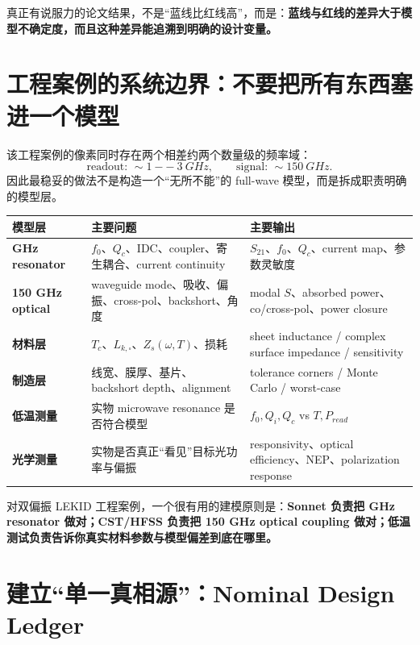 \documentclass[11pt,a4paper,openany]{ctexrep}
\begin{document}
\begin{intuitionbox}
真正有说服力的论文结果，不是“蓝线比红线高”，而是：\textbf{蓝线与红线的差异大于模型不确定度，而且这种差异能追溯到明确的设计变量。}
\end{intuitionbox}

\section{工程案例的系统边界：不要把所有东西塞进一个模型}

该工程案例的像素同时存在两个相差约两个数量级的频率域：
\[
\text{readout: }\sim\SI{1}{--}\SI{3}{GHz},
\qquad
\text{signal: }\sim\SI{150}{GHz}.
\]
因此最稳妥的做法不是构造一个“无所不能”的 full-wave 模型，而是拆成职责明确的模型层。

\begin{center}
\noindent\begin{tabularx}{\textwidth}{>{\bfseries}p{2.4cm} X X}
\toprule
模型层 & 主要问题 & 主要输出 \\
\midrule
GHz resonator & $f_0$、$Q_c$、IDC、coupler、寄生耦合、current continuity & $S_{21}$、$f_0$、$Q_c$、current map、参数灵敏度 \\
150 GHz optical & waveguide mode、吸收、偏振、cross-pol、backshort、角度 & modal $S$、absorbed power、co/cross-pol、power closure \\
材料层 & $T_c$、$L_{k,\square}$、$Z_s(\omega,T)$、损耗 & sheet inductance / complex surface impedance / sensitivity \\
制造层 & 线宽、膜厚、基片、backshort depth、alignment & tolerance corners / Monte Carlo / worst-case \\
低温测量 & 实物 microwave resonance 是否符合模型 & $f_0,Q_i,Q_c$ vs $T,P_{read}$ \\
光学测量 & 实物是否真正“看见”目标光功率与偏振 & responsivity、optical efficiency、NEP、polarization response \\
\bottomrule
\end{tabularx}
\end{center}

\begin{projectbox}
对双偏振 LEKID 工程案例，一个很有用的建模原则是：\textbf{Sonnet 负责把 GHz resonator 做对；CST/HFSS 负责把 150 GHz optical coupling 做对；低温测试负责告诉你真实材料参数与模型偏差到底在哪里。}
\end{projectbox}

\section{建立“单一真相源”：Nominal Design Ledger}
\end{document}

